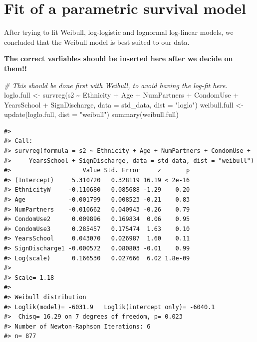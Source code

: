 \documentclass[
]{article}
\newenvironment{Shaded}{\begin{snugshade}}{\end{snugshade}}
\newcommand{\AttributeTok}[1]{\textcolor[rgb]{0.77,0.63,0.00}{#1}}
\newcommand{\CommentTok}[1]{\textcolor[rgb]{0.56,0.35,0.01}{\textit{#1}}}
\newcommand{\FunctionTok}[1]{\textcolor[rgb]{0.00,0.00,0.00}{#1}}
\newcommand{\NormalTok}[1]{#1}
\newcommand{\OtherTok}[1]{\textcolor[rgb]{0.56,0.35,0.01}{#1}}
\newcommand{\SpecialCharTok}[1]{\textcolor[rgb]{0.00,0.00,0.00}{#1}}
\newcommand{\StringTok}[1]{\textcolor[rgb]{0.31,0.60,0.02}{#1}}
\begin{document}
\hypertarget{fit-of-a-parametric-survival-model}{%
\section{Fit of a parametric survival model}\label{fit-of-a-parametric-survival-model}}

After trying to fit Weibull, log-logistic and lognormal log-linear models, we concluded that the Weibull model is best suited to our data.

\textbf{The correct varliables should be inserted here after we decide on them!!}

\begin{Shaded}
\begin{Highlighting}[]
\CommentTok{\# This should be done first with Weibull, to avoid having the log{-}fit here. }
\NormalTok{loglo.full }\OtherTok{\textless{}{-}} \FunctionTok{survreg}\NormalTok{(s2 }\SpecialCharTok{\textasciitilde{}}\NormalTok{ Ethnicity }\SpecialCharTok{+}\NormalTok{ Age }\SpecialCharTok{+}\NormalTok{ NumPartners }\SpecialCharTok{+}\NormalTok{ CondomUse }\SpecialCharTok{+}\NormalTok{ YearsSchool }\SpecialCharTok{+}\NormalTok{ SignDischarge, }\AttributeTok{data =}\NormalTok{ std\_data, }\AttributeTok{dist =} \StringTok{"loglo"}\NormalTok{)}
\NormalTok{weibull.full }\OtherTok{\textless{}{-}} \FunctionTok{update}\NormalTok{(loglo.full, }\AttributeTok{dist =} \StringTok{"weibull"}\NormalTok{)}
\FunctionTok{summary}\NormalTok{(weibull.full)}
\end{Highlighting}
\end{Shaded}

\begin{verbatim}
#> 
#> Call:
#> survreg(formula = s2 ~ Ethnicity + Age + NumPartners + CondomUse + 
#>     YearsSchool + SignDischarge, data = std_data, dist = "weibull")
#>                    Value Std. Error     z       p
#> (Intercept)     5.310720   0.328119 16.19 < 2e-16
#> EthnicityW     -0.110680   0.085688 -1.29    0.20
#> Age            -0.001799   0.008523 -0.21    0.83
#> NumPartners    -0.010662   0.040943 -0.26    0.79
#> CondomUse2      0.009896   0.169834  0.06    0.95
#> CondomUse3      0.285457   0.175474  1.63    0.10
#> YearsSchool     0.043070   0.026987  1.60    0.11
#> SignDischarge1 -0.000572   0.080803 -0.01    0.99
#> Log(scale)      0.166530   0.027666  6.02 1.8e-09
#> 
#> Scale= 1.18 
#> 
#> Weibull distribution
#> Loglik(model)= -6031.9   Loglik(intercept only)= -6040.1
#>  Chisq= 16.29 on 7 degrees of freedom, p= 0.023 
#> Number of Newton-Raphson Iterations: 6 
#> n= 877
\end{verbatim}
\end{document}

